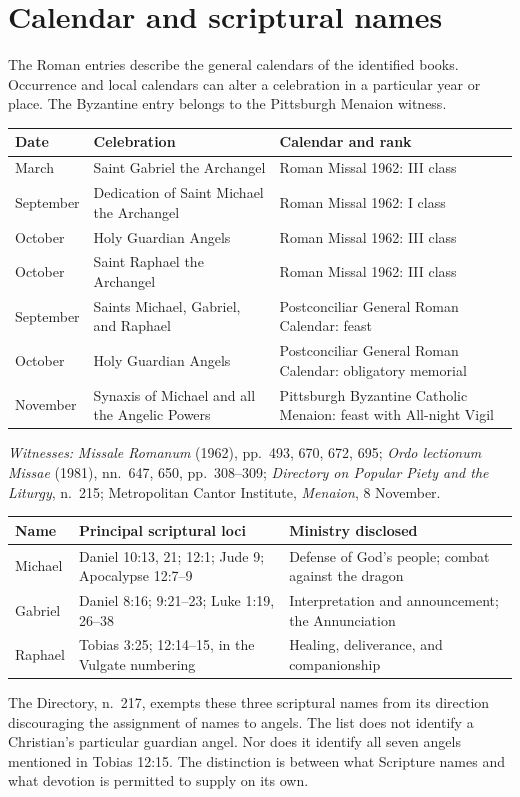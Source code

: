 \section{Calendar and scriptural names}

The Roman entries describe the general calendars of the identified books.
Occurrence and local calendars can alter a celebration in a particular year
or place. The Byzantine entry belongs to the Pittsburgh Menaion witness.

\begin{longtable}{>{\raggedright\arraybackslash}p{.15\linewidth}>{\raggedright\arraybackslash}p{.42\linewidth}>{\raggedright\arraybackslash}p{.33\linewidth}}
\textbf{Date} & \textbf{Celebration} & \textbf{Calendar and rank}\\\hline\endhead
24 March & Saint Gabriel the Archangel & Roman Missal 1962: III class\\
29 September & Dedication of Saint Michael the Archangel & Roman Missal 1962: I class\\
2 October & Holy Guardian Angels & Roman Missal 1962: III class\\
24 October & Saint Raphael the Archangel & Roman Missal 1962: III class\\
29 September & Saints Michael, Gabriel, and Raphael & Postconciliar General Roman Calendar: feast\\
2 October & Holy Guardian Angels & Postconciliar General Roman Calendar: obligatory memorial\\
8 November & Synaxis of Michael and all the Angelic Powers & Pittsburgh Byzantine Catholic Menaion: feast with All-night Vigil\\
\end{longtable}

\noindent\textit{Witnesses:} \emph{Missale Romanum} (1962), pp.~493, 670,
672, 695; \emph{Ordo lectionum Missae} (1981), nn.~647, 650,
pp.~308--309; \emph{Directory on Popular Piety and the Liturgy}, n.~215;
Metropolitan Cantor Institute, \emph{Menaion}, 8 November.

\begin{longtable}{>{\raggedright\arraybackslash}p{.16\linewidth}>{\raggedright\arraybackslash}p{.39\linewidth}>{\raggedright\arraybackslash}p{.35\linewidth}}
\textbf{Name} & \textbf{Principal scriptural loci} & \textbf{Ministry disclosed}\\\hline\endhead
Michael & Daniel 10:13, 21; 12:1; Jude 9; Apocalypse 12:7--9 & Defense of God's people; combat against the dragon\\
Gabriel & Daniel 8:16; 9:21--23; Luke 1:19, 26--38 & Interpretation and announcement; the Annunciation\\
Raphael & Tobias 3:25; 12:14--15, in the Vulgate numbering & Healing, deliverance, and companionship\\
\end{longtable}

The Directory, n.~217, exempts these three scriptural names from its
direction discouraging the assignment of names to angels. The list does
not identify a Christian's particular guardian angel. Nor does it identify
all seven angels mentioned in Tobias 12:15. The distinction is between
what Scripture names and what devotion is permitted to supply on its own.
